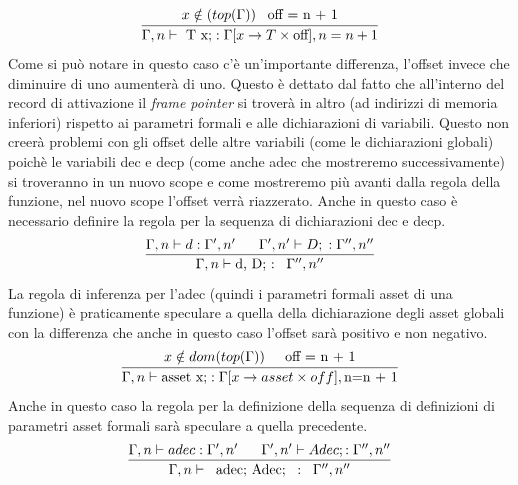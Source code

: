 \documentclass[12pt, a4paper]{report}
\begin{document}
\[\infer{\Gamma, n \vdash \mbox{ T x;} : \Gamma[x \rightarrow T \times \mbox{off} ], n = n + 1}{ x \notin (top(\Gamma)) \;\;\; \mbox{off = n + 1}}\]
Come si può notare in questo caso c'è un'importante differenza, l'offset invece che diminuire di uno aumenterà di uno. Questo è dettato dal fatto che all'interno del record di attivazione il \emph{frame pointer} si troverà in altro (ad indirizzi di memoria inferiori) rispetto ai parametri formali e alle dichiarazioni di variabili. Questo non creerà problemi con gli offset delle altre variabili (come le dichiarazioni globali) poichè le variabili dec e decp (come anche adec che mostreremo successivamente) si troveranno in un nuovo scope e come mostreremo più avanti dalla regola della funzione, nel nuovo scope l'offset verrà riazzerato.
Anche in questo caso è necessario definire la regola per la sequenza di dichiarazioni dec e decp. 
\[\infer{\Gamma, n \vdash \mbox{d, D; :} \;\;\; \Gamma'', n''}{\Gamma, n \vdash d: \Gamma',n' \;\;\;\;\;\; \Gamma', n' \vdash D; \; : \Gamma'', n'' }\]
La regola di inferenza per l'adec (quindi i parametri formali asset di una funzione) è praticamente speculare a quella della dichiarazione degli asset globali con la differenza che anche in questo caso l'offset sarà positivo e non negativo.
\[\infer{\Gamma, n \vdash \mbox{asset x;} : \Gamma[x \rightarrow asset \times off], \mbox{n=n + 1}}
{x \notin dom(top(\Gamma)) \;\;\;\; \mbox{ off = n + 1}} \]
Anche in questo caso la regola per la definizione della sequenza di definizioni di parametri asset formali sarà speculare a quella precedente.
\[\infer{\Gamma, n \vdash \;\;\mbox{adec; Adec;} \;\;:\;\; \Gamma'', n''}
{\Gamma, n \vdash adec: \Gamma',n' \;\;\;\;\;\; \Gamma', n' \vdash Adec; : \Gamma'', n'' }\]
\newpage
\end{document}
